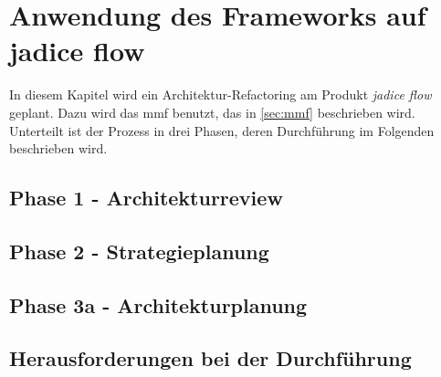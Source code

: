 \chapter{Anwendung des Frameworks auf jadice flow} %
\label{chap:anwendung}

In diesem Kapitel wird ein Architektur-Refactoring am Produkt \emph{jadice flow} geplant.
Dazu wird das \gls{mmf} benutzt, das in \cref{sec:mmf} beschrieben wird.
Unterteilt ist der Prozess in drei Phasen, deren Durchführung im Folgenden beschrieben wird.

\section{Phase 1 - Architekturreview}
\section{Phase 2 - Strategieplanung}
\section{Phase 3a - Architekturplanung}
\section{Herausforderungen bei der Durchführung}
